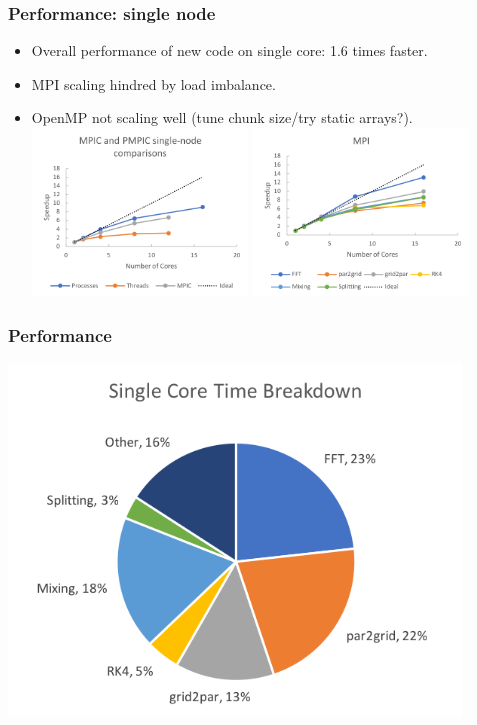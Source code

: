\documentclass{beamer}
\begin{document}
\begin{frame}
\frametitle{Performance: single node}

\begin{itemize}
\item Overall performance of new code on single core: 1.6 times faster.
\item MPI scaling hindred by load imbalance.
\item OpenMP not scaling well (tune chunk size/try static arrays?).
\includegraphics[width=0.45\textwidth]{pmpic_images/singleNode.png} 
\includegraphics[width=0.45\textwidth]{pmpic_images/MPISingle.png} 
\end{itemize}

\end{frame}

\begin{frame}
\frametitle{Performance}

\includegraphics[width=0.90\textwidth]{pmpic_images/pie.png} 

\end{frame}
\end{document}
